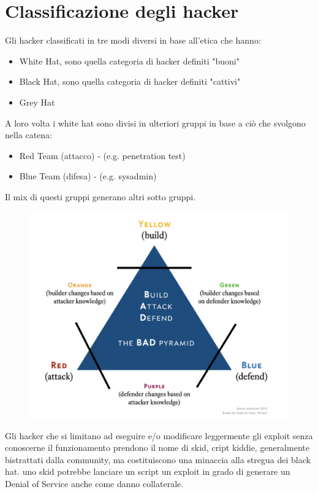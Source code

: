 \section{Classificazione degli hacker}
Gli hacker classificati in tre modi diversi in base all'etica che hanno:
\begin{itemize}
    \item White Hat, sono quella categoria di hacker definiti "buoni"
    \item Black Hat, sono quella categoria di hacker definiti "cattivi"
    \item Grey Hat
\end{itemize}
 A loro volta i white hat sono divisi in ulteriori gruppi in base a ciò che svolgono nella catena:
 \begin{itemize}
     \item Red Team (attacco) - (e.g. penetration test)
     \item Blue Team (difesa) - (e.g. sysadmin)
 \end{itemize}
 Il mix di questi gruppi generano altri sotto gruppi.
 \begin{figure}[h!]
    \centering
    \includegraphics[width=\linewidth]{res/hacker_classification.png}
    \caption{}
\end{figure}
Gli hacker che si limitano ad eseguire e/o modificare leggermente gli exploit senza conoscerne il funzionamento prendono il nome di skid, cript kiddie, generalmente bistrattati dalla community, ma costituiscono una minaccia alla stregua dei black hat. uno skid potrebbe lanciare un script un exploit in grado di generare un Denial of Service anche come danno collaterale.

